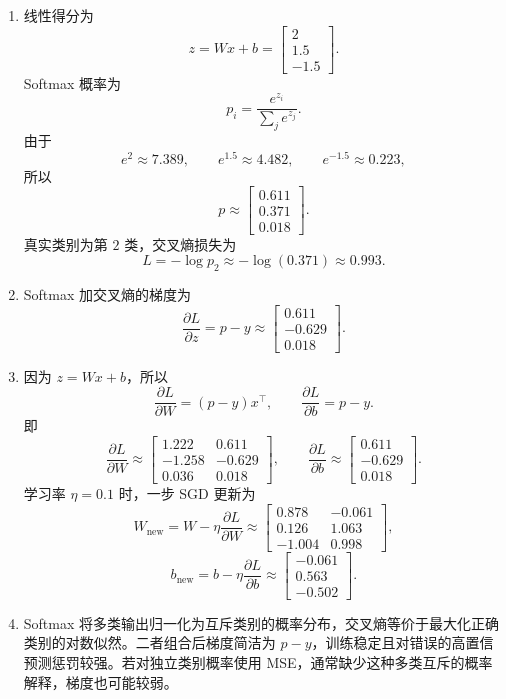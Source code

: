 \documentclass[UTF8,zihao=-4]{ctexart}
\begin{document}
\begin{enumerate}[label=(\arabic*)]
\item 线性得分为
\[
z=Wx+b
=\begin{bmatrix}
2\\
1.5\\
-1.5
\end{bmatrix}.
\]
Softmax 概率为
\[
p_i=\frac{e^{z_i}}{\sum_j e^{z_j}}.
\]
由于
\[
e^2\approx 7.389,\qquad e^{1.5}\approx 4.482,\qquad e^{-1.5}\approx 0.223,
\]
所以
\[
p\approx
\begin{bmatrix}
0.611\\
0.371\\
0.018
\end{bmatrix}.
\]
真实类别为第 $2$ 类，交叉熵损失为
\[
L=-\log p_2\approx -\log(0.371)\approx 0.993.
\]

\item Softmax 加交叉熵的梯度为
\[
\frac{\partial L}{\partial z}=p-y
\approx
\begin{bmatrix}
0.611\\
-0.629\\
0.018
\end{bmatrix}.
\]

\item 因为 $z=Wx+b$，所以
\[
\frac{\partial L}{\partial W}=(p-y)x^\top,\qquad
\frac{\partial L}{\partial b}=p-y.
\]
即
\[
\frac{\partial L}{\partial W}\approx
\begin{bmatrix}
1.222&0.611\\
-1.258&-0.629\\
0.036&0.018
\end{bmatrix},\qquad
\frac{\partial L}{\partial b}\approx
\begin{bmatrix}
0.611\\
-0.629\\
0.018
\end{bmatrix}.
\]
学习率 $\eta=0.1$ 时，一步 SGD 更新为
\[
W_{\mathrm{new}}=W-\eta\frac{\partial L}{\partial W}
\approx
\begin{bmatrix}
0.878&-0.061\\
0.126&1.063\\
-1.004&0.998
\end{bmatrix},
\]
\[
b_{\mathrm{new}}=b-\eta\frac{\partial L}{\partial b}
\approx
\begin{bmatrix}
-0.061\\
0.563\\
-0.502
\end{bmatrix}.
\]

\item Softmax 将多类输出归一化为互斥类别的概率分布，交叉熵等价于最大化正确类别的对数似然。二者组合后梯度简洁为 $p-y$，训练稳定且对错误的高置信预测惩罚较强。若对独立类别概率使用 MSE，通常缺少这种多类互斥的概率解释，梯度也可能较弱。
\end{enumerate}
\end{document}
